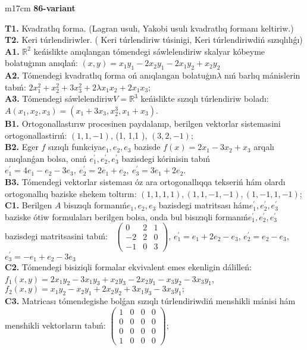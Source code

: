 \documentclass{article}
\begin{document}
\begin{tabular}{m{17cm}}
\textbf{86-variant}
\newline

\textbf{T1.} Kvadratlıq forma. (Lagran usulı, Yakobi usulı kvadratlıq formanı keltiriw.) \\
\textbf{T2.} Keri túrlendiriwler. ( Keri túrlendiriw túsinigi,   Keri túrlendiriwdiń sızıqlılıǵı) \\
\textbf{A1.} \(\mathbb{R}^{2}\) keńislikte anıqlangan tómendegi sáwlelendiriw skalyar kóbeyme bolatuģının anıqlań: \((x,y) = x_{1}y_{1} - 2x_{2}y_{1} - 2x_{1}y_{2} + x_{2}y_{2}\) \\
\textbf{A2.} Tómendegi kvadratlıq forma oń anıqlangan bolatuģın\(\lambda\) nıń barlıq mánislerin tabıń: \(2x_{1}^{2} + x_{2}^{2} + 3x_{3}^{2} + 2\lambda x_{1}x_{2} + 2x_{1}x_{3}\); \\
\textbf{A3.} Tómendegi sáwlelendiriw\(V = \mathbb{R}^{3}\) keńislikte sızıqlı túrlendiriw boladı: \(A\left( x_{1},x_{2},x_{3} \right) = \left( x_{1} + 3x_{3},x_{2}^{3},x_{1} + x_{3} \right)\). \\
\textbf{B1.} Ortogonallastırıw procesinen paydalanıp, berilgen vektorlar sistemasini ortogonallastirıń: \((1,1, - 1)\), (1, 1,1 ), \((3,2, - 1)\); \\
\textbf{B2.} Eger \(f\) sızıqlı funkciya\(e_{1},e_{2},e_{3}\) bazisde \(f(x) = 2x_{1} - 3x_{2} + x_{3}\) arqalı anıqlanǵan bolsa, onıń \(e_{1}^{'},e_{2}^{'},e_{3}^{'}\) bazisdegi kórinisin tabıń\(e_{1}^{'} = 4e_{1} - e_{2} - 3e_{3},\ e_{2}^{'} = 2e_{1} + e_{2},\ e_{3}^{'} = 3e_{1} + 2e_{2}\). \\
\textbf{B3.} Tómendegi vektorlar sisteması óz ara ortogonallıqqa tekseriń hám olardı ortogonallıq baziske shekem toltırın: \((1,1,1,1),(1,1, - 1, - 1),(1, - 1,1, - 1)\); \\
\textbf{C1.} Berilgen \(A\) bisızıqlı formanıń\(e_{1},e_{2},e_{3}\) bazisdegi matritsası hám\(e_{1}^{'},e_{2}^{'},e_{3}^{'}\) baziske ótiw formulaları berilgen bolsa, onda bul bisızıqli formanıń\(e_{1}^{'},e_{2}^{'},e_{3}^{'}\) bazisdegi matritsasini tabıń: \(\ \) \(\begin{pmatrix} 0 & 2 & 1 \\  - 2 & 2 & 0 \\  - 1 & 0 & 3 \end{pmatrix}\), \(e_{1}^{'} = e_{1} + 2e_{2} - e_{3}\), \(e_{2}^{'} = e_{2} - e_{3}\), \(e_{3}^{'} = - e_{1} + e_{2} - 3e_{3}\) \\
\textbf{C2.} Tómendegi bisiziqli formalar ekvivalent emes ekenligin dálilleń:\(f_{1}(x,y) = 2x_{1}y_{2} - 3x_{1}y_{3} + x_{2}y_{3} - 2x_{2}y_{1} - x_{3}y_{2} - 3x_{3}y_{1}\),\(f_{2}(x,y) = x_{1}y_{2} - x_{2}y_{1} + 2x_{2}y_{2} + 3x_{1}y_{3} - 3x_{3}y_{1};\) \\
\textbf{C3.} Matricası tómendegishe bolǵan sızıqlı túrlendiriwdiń menshikli mánisi hám menshikli vektorların tabıń: \(\begin{pmatrix} 1 & 0 & 0 & 0 \\ 0 & 0 & 0 & 0 \\ 0 & 0 & 0 & 0 \\ 1 & 0 & 0 & 0 \end{pmatrix}\); \\

\end{tabular}
\end{document}
